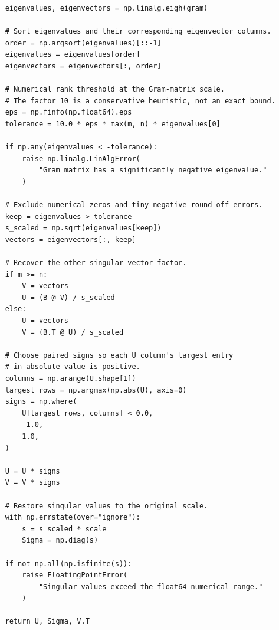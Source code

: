 \documentclass[12pt,a4paper]{report}
\theoremstyle{plain}
\theoremstyle{definition}
\theoremstyle{remark}
\theoremstyle{definition}
\begin{document}
\begin{lstlisting}
    eigenvalues, eigenvectors = np.linalg.eigh(gram)

    # Sort eigenvalues and their corresponding eigenvector columns.
    order = np.argsort(eigenvalues)[::-1]
    eigenvalues = eigenvalues[order]
    eigenvectors = eigenvectors[:, order]

    # Numerical rank threshold at the Gram-matrix scale.
    # The factor 10 is a conservative heuristic, not an exact bound.
    eps = np.finfo(np.float64).eps
    tolerance = 10.0 * eps * max(m, n) * eigenvalues[0]

    if np.any(eigenvalues < -tolerance):
        raise np.linalg.LinAlgError(
            "Gram matrix has a significantly negative eigenvalue."
        )

    # Exclude numerical zeros and tiny negative round-off errors.
    keep = eigenvalues > tolerance
    s_scaled = np.sqrt(eigenvalues[keep])
    vectors = eigenvectors[:, keep]

    # Recover the other singular-vector factor.
    if m >= n:
        V = vectors
        U = (B @ V) / s_scaled
    else:
        U = vectors
        V = (B.T @ U) / s_scaled

    # Choose paired signs so each U column's largest entry
    # in absolute value is positive.
    columns = np.arange(U.shape[1])
    largest_rows = np.argmax(np.abs(U), axis=0)
    signs = np.where(
        U[largest_rows, columns] < 0.0,
        -1.0,
        1.0,
    )

    U = U * signs
    V = V * signs

    # Restore singular values to the original scale.
    with np.errstate(over="ignore"):
        s = s_scaled * scale
        Sigma = np.diag(s)

    if not np.all(np.isfinite(s)):
        raise FloatingPointError(
            "Singular values exceed the float64 numerical range."
        )

    return U, Sigma, V.T
\end{lstlisting}
\end{document}
